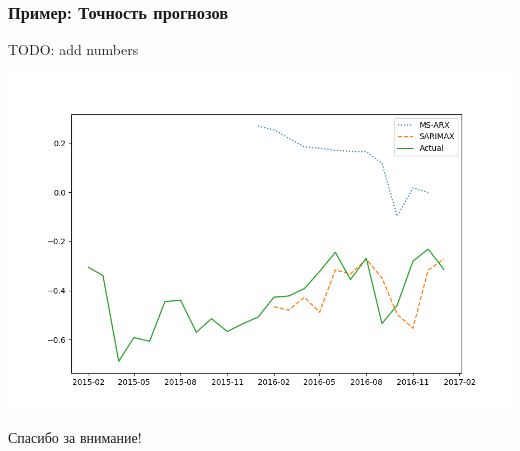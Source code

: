\documentclass{beamer}
\begin{document}
		\begin{frame}
			\frametitle{Пример: Точность прогнозов}
			
			TODO: add numbers
			
			\includegraphics[height=0.8\textheight]{compare_ham}
		\end{frame}
		
	
	\begin{frame}[plain]
		\huge{Спасибо за внимание!}
	\end{frame}
	
\end{document}
